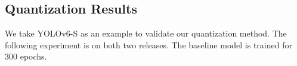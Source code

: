 \documentclass[10pt,twocolumn,letterpaper]{article}
\begin{document}
\begin{table}[ht]
  \centering
  \caption{Experimental results about the strategies for solving the problem of the performance degradation without extra gray border.}
  \label{tab:stopmosaic}
\end{table}










\subsection{Quantization Results}
We take YOLOv6-S as an example to validate our quantization method. The following experiment is on both two releases. The baseline model is trained for 300 epochs. 
\end{document}
